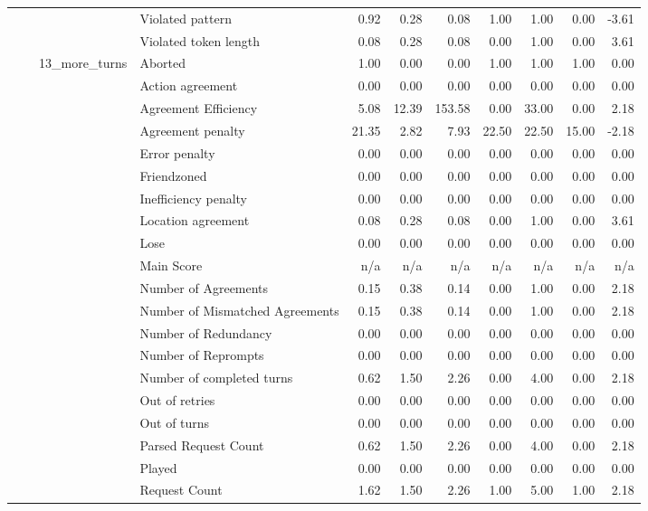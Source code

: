\begin{tabular}{llllrrrrrrr}
 &  &  & Violated pattern & 0.92 & 0.28 & 0.08 & 1.00 & 1.00 & 0.00 & -3.61 \\
 &  &  & Violated token length & 0.08 & 0.28 & 0.08 & 0.00 & 1.00 & 0.00 & 3.61 \\
\cline{3-11}
 &  & \multirow[t]{27}{*}{13_more_turns} & Aborted & 1.00 & 0.00 & 0.00 & 1.00 & 1.00 & 1.00 & 0.00 \\
 &  &  & Action agreement & 0.00 & 0.00 & 0.00 & 0.00 & 0.00 & 0.00 & 0.00 \\
 &  &  & Agreement Efficiency & 5.08 & 12.39 & 153.58 & 0.00 & 33.00 & 0.00 & 2.18 \\
 &  &  & Agreement penalty & 21.35 & 2.82 & 7.93 & 22.50 & 22.50 & 15.00 & -2.18 \\
 &  &  & Error penalty & 0.00 & 0.00 & 0.00 & 0.00 & 0.00 & 0.00 & 0.00 \\
 &  &  & Friendzoned & 0.00 & 0.00 & 0.00 & 0.00 & 0.00 & 0.00 & 0.00 \\
 &  &  & Inefficiency penalty & 0.00 & 0.00 & 0.00 & 0.00 & 0.00 & 0.00 & 0.00 \\
 &  &  & Location agreement & 0.08 & 0.28 & 0.08 & 0.00 & 1.00 & 0.00 & 3.61 \\
 &  &  & Lose & 0.00 & 0.00 & 0.00 & 0.00 & 0.00 & 0.00 & 0.00 \\
 &  &  & Main Score & n/a & n/a & n/a & n/a & n/a & n/a & n/a \\
 &  &  & Number of Agreements & 0.15 & 0.38 & 0.14 & 0.00 & 1.00 & 0.00 & 2.18 \\
 &  &  & Number of Mismatched Agreements & 0.15 & 0.38 & 0.14 & 0.00 & 1.00 & 0.00 & 2.18 \\
 &  &  & Number of Redundancy & 0.00 & 0.00 & 0.00 & 0.00 & 0.00 & 0.00 & 0.00 \\
 &  &  & Number of Reprompts & 0.00 & 0.00 & 0.00 & 0.00 & 0.00 & 0.00 & 0.00 \\
 &  &  & Number of completed turns & 0.62 & 1.50 & 2.26 & 0.00 & 4.00 & 0.00 & 2.18 \\
 &  &  & Out of retries & 0.00 & 0.00 & 0.00 & 0.00 & 0.00 & 0.00 & 0.00 \\
 &  &  & Out of turns & 0.00 & 0.00 & 0.00 & 0.00 & 0.00 & 0.00 & 0.00 \\
 &  &  & Parsed Request Count & 0.62 & 1.50 & 2.26 & 0.00 & 4.00 & 0.00 & 2.18 \\
 &  &  & Played & 0.00 & 0.00 & 0.00 & 0.00 & 0.00 & 0.00 & 0.00 \\
 &  &  & Request Count & 1.62 & 1.50 & 2.26 & 1.00 & 5.00 & 1.00 & 2.18 \\

\end{tabular}
